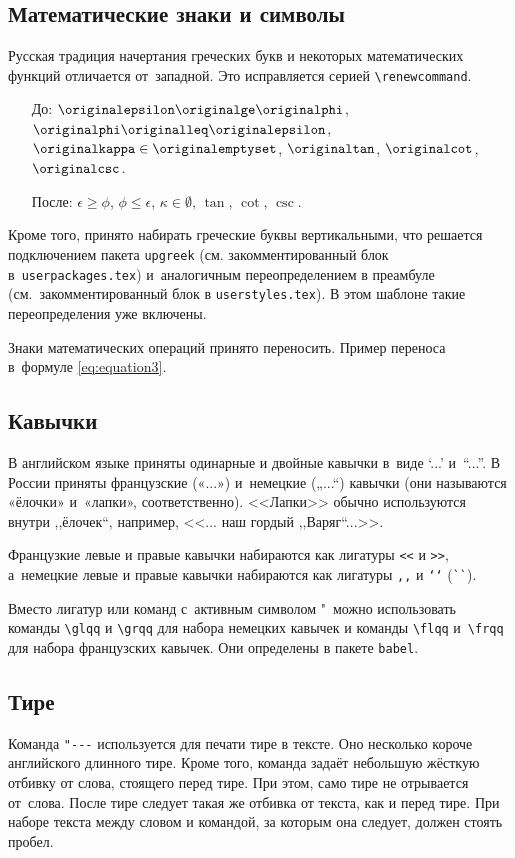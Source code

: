 \subsection{Математические знаки и символы}

Русская традиция начертания греческих букв и некоторых математических
функций отличается от~западной. Это исправляется серией
\verb|\renewcommand|.
\begin{itemize}
    \item[До:] \( \originalepsilon \originalge \originalphi\),
    \(\originalphi \originalleq \originalepsilon\),
    \(\originalkappa \in \originalemptyset\),
    \(\originaltan\),
    \(\originalcot\),
    \(\originalcsc\).
    \item[После:] \( \epsilon \ge \phi\),
    \(\phi \leq \epsilon\),
    \(\kappa \in \emptyset\),
    \(\tan\),
    \(\cot\),
    \(\csc\).
\end{itemize}

Кроме того, принято набирать греческие буквы вертикальными, что
решается подключением пакета \verb|upgreek| (см. закомментированный
блок в~\verb|userpackages.tex|) и~аналогичным переопределением в
преамбуле (см.~закомментированный блок в \verb|userstyles.tex|). В
этом шаблоне такие переопределения уже включены.

Знаки математических операций принято переносить. Пример переноса
в~формуле \eqref{eq:equation3}.

\subsection{Кавычки}
В английском языке приняты одинарные и двойные кавычки в~виде ‘...’ и~“...”. В России приняты французские («...») и~немецкие („...“) кавычки (они называются «ёлочки» и~«лапки», соответственно). <<Лапки>> обычно используются внутри ,,ёлочек``, например, <<... наш гордый ,,Варяг``...>>.

Французкие левые и правые кавычки набираются
как лигатуры \verb|<<| и \verb|>>|, а~немецкие левые и правые кавычки набираются как лигатуры \verb|,,| и \verb|‘‘| (\verb|``|).

Вместо лигатур или команд с~активным символом "\ можно использовать команды \verb|\glqq| и \verb|\grqq| для набора немецких кавычек и команды \verb|\flqq| и~\verb|\frqq| для набора французских кавычек. Они определены в пакете \verb|babel|.

\subsection{Тире}
Команда \verb|"---| используется для печати тире в тексте. Оно несколько короче английского длинного тире. Кроме того, команда задаёт небольшую жёсткую отбивку от слова, стоящего перед тире. При этом, само тире не отрывается от~слова. После тире следует такая же отбивка от текста, как и перед тире. При наборе текста между словом и командой, за которым она следует, должен стоять пробел.

